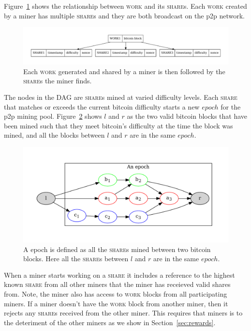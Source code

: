 \documentclass{article}
\begin{document}
Figure~\ref{fig:work-share} shows the relationship between
\textsc{work} and its \textsc{share}s. Each \textsc{work} created by a
miner has multiple \textsc{share}s and they are both broadcast on the
p2p network.

\begin{figure}[h]
  \begin{center}
    \includegraphics[width=1.0\textwidth]{work-share}
    \caption{Each \textsc{work} generated and shared by a miner is then
      followed by the \textsc{share}s the miner finds.}\label{fig:work-share}
    \end{center}
\end{figure}

The nodes in the DAG are \textsc{share}s mined at varied difficulty
levels. Each \textsc{share} that matches or exceeds the current
bitcoin difficulty starts a new $epoch$ for the p2p mining
pool. Figure~\ref{fig:epoch} shows $l$ and $r$ as the two valid
bitcoin blocks that have been mined such that they meet bitcoin's
difficulty at the time the block was mined, and all the blocks between
$l$ and $r$ are in the same $epoch$.

\begin{figure}[h]
  \includegraphics[width=1.0\textwidth]{epoch}
  \caption{A epoch is defined as all the \textsc{share}s mined between two
    bitcoin blocks. Here all the \textsc{share}s between $l$ and $r$ are in
    the same $epoch$.}\label{fig:epoch}
\end{figure}

When a miner starts working on a \textsc{share} it includes a
reference to the highest known \textsc{share} from all other miners
that the miner has receieved valid shares from. Note, the miner also
has access to \textsc{work} blocks from all participating miners. If a
miner doesn't have the \textsc{work} block from another miner, then it
rejects any \textsc{share}s received from the other miner. This
requires that miners is to the deteriment of the other miners as we
show in Section~\ref{sec:rewards}.
\end{document}
